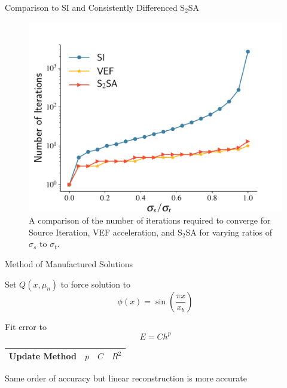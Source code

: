 \documentclass[10pt]{beamer}
\begin{document}
\begin{frame}{Comparison to SI and Consistently Differenced S$_2$SA}

	\begin{figure}[htb]
		\centering
		\includegraphics[width=.75\textwidth]{figs/si_vef_s2sa.pdf} 
		\caption{A comparison of the number of iterations required to converge for Source Iteration, VEF acceleration, and S$_2$SA for varying ratios of $\sigma_s$ to $\sigma_t$. } 
		\label{fig:si_vef_s2sa}
	\end{figure}

\end{frame}

\begin{frame}{Method of Manufactured Solutions}

	Set $Q(x, \mu_n)$ to force solution to 
	\begin{equation*}
		\phi(x) = \sin\left(\frac{\pi x}{x_b}\right)
	\end{equation*}

	Fit error to 
	\begin{equation*}
		E = C h^p 
	\end{equation*}

	\begin{table}[htb]
	\centering
	\begin{tabular}{|c|c|c|c|}
	\hline
	Update Method & $p$ & $C$ & $R^2$ \\ 
	\hline
		
	\hline
	\end{tabular}
	\label{tab:mms}
	\end{table}

	\pause 
	\begin{block}{}
		\centering Same order of accuracy but linear reconstruction is more accurate 
	\end{block}

\end{frame}
\end{document}
